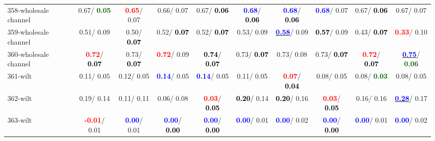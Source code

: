 \begin{table}[h]
\begin{center}
{\begin{tabular}{lc|c|c|c|c|c|c|c|c}
358-wholesale channel &   0.67/\textcolor{darkgreen}{\textbf{  0.05}} & \textcolor{red}{\textbf{  0.65}}/  0.07 &   0.66/  0.07 &   0.67/\textcolor{black}{\textbf{  0.06}} & \textcolor{blue}{\textbf{  0.68}}/\textcolor{black}{\textbf{  0.06}} & \textcolor{blue}{\textbf{  0.68}}/\textcolor{black}{\textbf{  0.06}} & \textcolor{blue}{\textbf{  0.68}}/  0.07 &   0.67/\textcolor{black}{\textbf{  0.06}} &   0.67/  0.07 \\
359-wholesale channel &   0.51/  0.09 &   0.50/\textcolor{black}{\textbf{  0.07}} &   0.52/\textcolor{black}{\textbf{  0.07}} &   0.52/\textcolor{black}{\textbf{  0.07}} &   0.53/  0.09 & \underline{\textcolor{blue}{\textbf{  0.58}}}/  0.09 & \textcolor{black}{\textbf{  0.57}}/  0.09 &   0.43/\textcolor{black}{\textbf{  0.07}} & \textcolor{red}{\textbf{  0.33}}/  0.10 \\ \hline
360-wholesale channel & \textcolor{red}{\textbf{  0.72}}/\textcolor{black}{\textbf{  0.07}} &   0.73/\textcolor{black}{\textbf{  0.07}} & \textcolor{red}{\textbf{  0.72}}/  0.09 & \textcolor{black}{\textbf{  0.74}}/\textcolor{black}{\textbf{  0.07}} &   0.73/\textcolor{black}{\textbf{  0.07}} &   0.73/  0.08 &   0.73/\textcolor{black}{\textbf{  0.07}} & \textcolor{red}{\textbf{  0.72}}/\textcolor{black}{\textbf{  0.07}} & \underline{\textcolor{blue}{\textbf{  0.75}}}/\textcolor{darkgreen}{\textbf{  0.06}} \\
361-wilt &   0.11/  0.05 &   0.12/  0.05 & \textcolor{blue}{\textbf{  0.14}}/  0.05 & \textcolor{blue}{\textbf{  0.14}}/  0.05 &   0.11/  0.05 & \textcolor{red}{\textbf{  0.07}}/\textcolor{black}{\textbf{  0.04}} &   0.08/  0.05 &   0.08/\textcolor{darkgreen}{\textbf{  0.03}} &   0.08/  0.05 \\
362-wilt &   0.19/  0.14 &   0.11/  0.11 &   0.06/  0.08 & \textcolor{red}{\textbf{  0.03}}/\textcolor{black}{\textbf{  0.05}} & \textcolor{black}{\textbf{  0.20}}/  0.14 & \textcolor{black}{\textbf{  0.20}}/  0.16 & \textcolor{red}{\textbf{  0.03}}/\textcolor{black}{\textbf{  0.05}} &   0.16/  0.16 & \underline{\textcolor{blue}{\textbf{  0.28}}}/  0.17 \\
363-wilt & \textcolor{red}{\textbf{ -0.01}}/  0.01 & \textcolor{blue}{\textbf{  0.00}}/  0.01 & \textcolor{blue}{\textbf{  0.00}}/\textcolor{black}{\textbf{  0.00}} & \textcolor{blue}{\textbf{  0.00}}/\textcolor{black}{\textbf{  0.00}} & \textcolor{blue}{\textbf{  0.00}}/  0.01 & \textcolor{blue}{\textbf{  0.00}}/  0.02 & \textcolor{blue}{\textbf{  0.00}}/\textcolor{black}{\textbf{  0.00}} & \textcolor{blue}{\textbf{  0.00}}/  0.01 & \textcolor{blue}{\textbf{  0.00}}/  0.02 \\

\end{tabular}}
\end{center}
\end{table}

